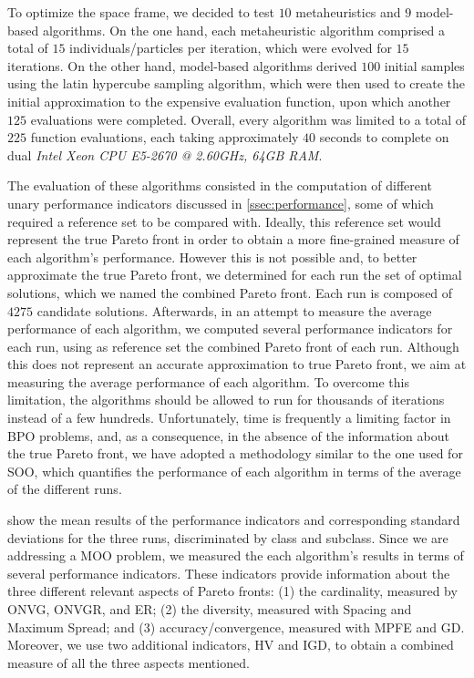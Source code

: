 To optimize the space frame, we decided to test $10$ metaheuristics and $9$ model-based algorithms. On the one hand, each metaheuristic algorithm comprised a total of $15$ individuals/particles per iteration, which were evolved for $15$ iterations. On the other hand, model-based algorithms derived $100$ initial samples using the latin hypercube sampling algorithm, which were then used to create the initial approximation to the expensive evaluation function, upon which another $125$ evaluations were completed. Overall, every algorithm was limited to a total of $225$ function evaluations, each taking approximately $40$ seconds to complete on dual \textit{Intel Xeon CPU E5-2670 @ 2.60GHz, 64GB RAM}. 

The evaluation of these algorithms consisted in the computation of different unary performance indicators discussed in \cref{ssec:performance}, some of which required a reference set to be compared with. Ideally, this reference set would represent the true Pareto front in order to obtain a more fine-grained measure of each algorithm's performance. However this is not possible and, to better approximate the true Pareto front, we determined for each run the set of optimal solutions, which we named the combined Pareto front. Each run is composed of $4275$ candidate solutions. Afterwards, in an attempt to measure the average performance of each algorithm, we computed several performance indicators for each run, using as reference set the combined Pareto front of each run. Although this does not represent an accurate approximation to true Pareto front, we aim at measuring the average performance of each algorithm. To overcome this limitation, the algorithms should be allowed to run for thousands of iterations instead of a few hundreds. Unfortunately, time is frequently a limiting factor in \ac{BPO} problems, and, as a consequence, in the absence of the information about the true Pareto front, we have adopted a methodology similar to the one used for \ac{SOO}, which quantifies the performance of each algorithm in terms of the average of the different runs. 

 show the mean results of the performance indicators and corresponding standard deviations for the three runs, discriminated by class and subclass. Since we are addressing a \ac{MOO} problem, we measured the each algorithm's results in terms of several performance indicators. These indicators provide information about the three different relevant aspects of Pareto fronts: (1) the cardinality, measured by \ac{ONVG}, \ac{ONVGR}, and \ac{ER}; (2) the diversity, measured with Spacing and Maximum Spread; and (3) accuracy/convergence, measured with \ac{MPFE} and \ac{GD}. Moreover, we use two additional indicators, \ac{HV} and \ac{IGD}, to obtain a combined measure of all the three aspects mentioned. %

